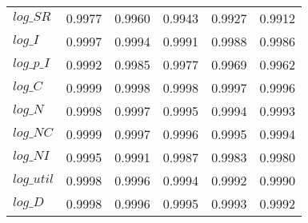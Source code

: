 \begin{center}
\begin{longtable}{lccccc}
$log\_SR    $	 & 	     0.9977	 & 	     0.9960	 & 	     0.9943	 & 	     0.9927	 & 	     0.9912 \\ 
$log\_I     $	 & 	     0.9997	 & 	     0.9994	 & 	     0.9991	 & 	     0.9988	 & 	     0.9986 \\ 
$log\_p\_I  $	 & 	     0.9992	 & 	     0.9985	 & 	     0.9977	 & 	     0.9969	 & 	     0.9962 \\ 
$log\_C     $	 & 	     0.9999	 & 	     0.9998	 & 	     0.9998	 & 	     0.9997	 & 	     0.9996 \\ 
$log\_N     $	 & 	     0.9998	 & 	     0.9997	 & 	     0.9995	 & 	     0.9994	 & 	     0.9993 \\ 
$log\_NC    $	 & 	     0.9999	 & 	     0.9997	 & 	     0.9996	 & 	     0.9995	 & 	     0.9994 \\ 
$log\_NI    $	 & 	     0.9995	 & 	     0.9991	 & 	     0.9987	 & 	     0.9983	 & 	     0.9980 \\ 
$log\_util  $	 & 	     0.9998	 & 	     0.9996	 & 	     0.9994	 & 	     0.9992	 & 	     0.9990 \\ 
$log\_D     $	 & 	     0.9998	 & 	     0.9996	 & 	     0.9995	 & 	     0.9993	 & 	     0.9992 \\ 
\end{longtable}
 \end{center}
